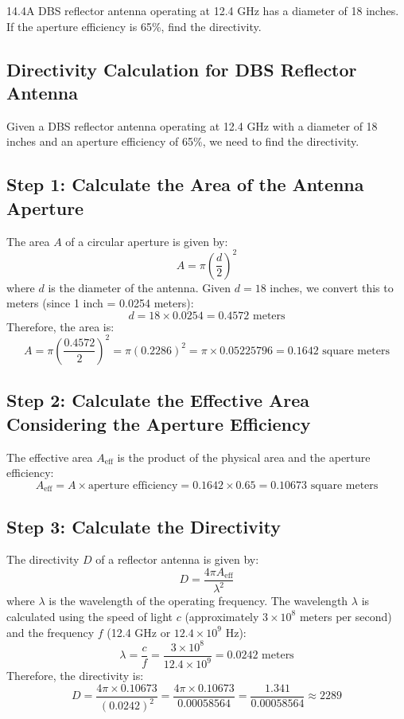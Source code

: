 \documentclass[cn,12pt]{homework}
\begin{document}
14.4A DBS reflector antenna operating at 12.4 GHz has a diameter of 18 inches. If the aperture efficiency
is 65\%, find the directivity.
\begin{solution}
\section*{Directivity Calculation for DBS Reflector Antenna}

Given a DBS reflector antenna operating at 12.4 GHz with a diameter of 18 inches and an aperture efficiency of 65\%, we need to find the directivity.

\subsection*{Step 1: Calculate the Area of the Antenna Aperture}
The area \( A \) of a circular aperture is given by:
\[ A = \pi \left( \frac{d}{2} \right)^2 \]
where \( d \) is the diameter of the antenna. Given \( d = 18 \) inches, we convert this to meters (since 1 inch = 0.0254 meters):
\[ d = 18 \times 0.0254 = 0.4572 \text{ meters} \]
Therefore, the area is:
\[ A = \pi \left( \frac{0.4572}{2} \right)^2 = \pi \left( 0.2286 \right)^2 = \pi \times 0.05225796 = 0.1642 \text{ square meters} \]

\subsection*{Step 2: Calculate the Effective Area Considering the Aperture Efficiency}
The effective area \( A_{\text{eff}} \) is the product of the physical area and the aperture efficiency:
\[ A_{\text{eff}} = A \times \text{aperture efficiency} = 0.1642 \times 0.65 = 0.10673 \text{ square meters} \]

\subsection*{Step 3: Calculate the Directivity}
The directivity \( D \) of a reflector antenna is given by:
\[ D = \frac{4\pi A_{\text{eff}}}{\lambda^2} \]
where \( \lambda \) is the wavelength of the operating frequency. The wavelength \( \lambda \) is calculated using the speed of light \( c \) (approximately \( 3 \times 10^8 \) meters per second) and the frequency \( f \) (12.4 GHz or \( 12.4 \times 10^9 \) Hz):
\[ \lambda = \frac{c}{f} = \frac{3 \times 10^8}{12.4 \times 10^9} = 0.0242 \text{ meters} \]
Therefore, the directivity is:
\[ D = \frac{4\pi \times 0.10673}{(0.0242)^2} = \frac{4\pi \times 0.10673}{0.00058564} = \frac{1.341}{0.00058564} \approx 2289 \]


\end{solution}
\end{document}
